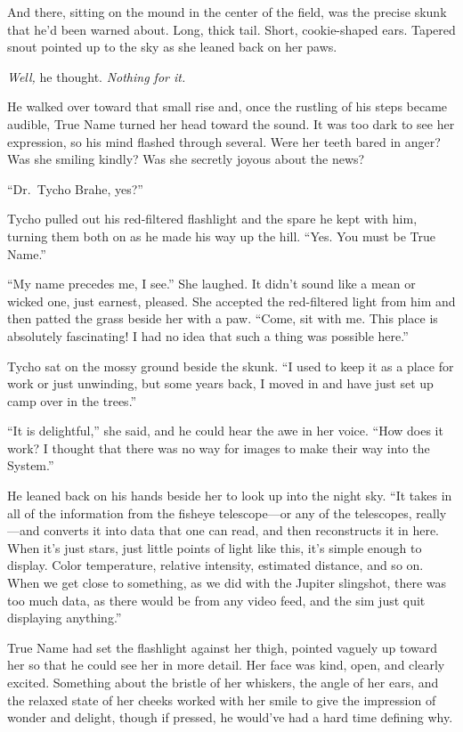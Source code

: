 And there, sitting on the mound in the center of the field, was the precise skunk that he'd been warned about. Long, thick tail. Short, cookie-shaped ears. Tapered snout pointed up to the sky as she leaned back on her paws.

\emph{Well,} he thought. \emph{Nothing for it.}

He walked over toward that small rise and, once the rustling of his steps became audible, True Name turned her head toward the sound. It was too dark to see her expression, so his mind flashed through several. Were her teeth bared in anger? Was she smiling kindly? Was she secretly joyous about the news?

``Dr.~Tycho Brahe, yes?''

Tycho pulled out his red-filtered flashlight and the spare he kept with him, turning them both on as he made his way up the hill. ``Yes. You must be True Name.''

``My name precedes me, I see.'' She laughed. It didn't sound like a mean or wicked one, just earnest, pleased. She accepted the red-filtered light from him and then patted the grass beside her with a paw. ``Come, sit with me. This place is absolutely fascinating! I had no idea that such a thing was possible here.''

Tycho sat on the mossy ground beside the skunk. ``I used to keep it as a place for work or just unwinding, but some years back, I moved in and have just set up camp over in the trees.''

``It is delightful,'' she said, and he could hear the awe in her voice. ``How does it work? I thought that there was no way for images to make their way into the System.''

He leaned back on his hands beside her to look up into the night sky. ``It takes in all of the information from the fisheye telescope—or any of the telescopes, really—and converts it into data that one can read, and then reconstructs it in here. When it's just stars, just little points of light like this, it's simple enough to display. Color temperature, relative intensity, estimated distance, and so on. When we get close to something, as we did with the Jupiter slingshot, there was too much data, as there would be from any video feed, and the sim just quit displaying anything.''

True Name had set the flashlight against her thigh, pointed vaguely up toward her so that he could see her in more detail. Her face was kind, open, and clearly excited. Something about the bristle of her whiskers, the angle of her ears, and the relaxed state of her cheeks worked with her smile to give the impression of wonder and delight, though if pressed, he would've had a hard time defining why.

